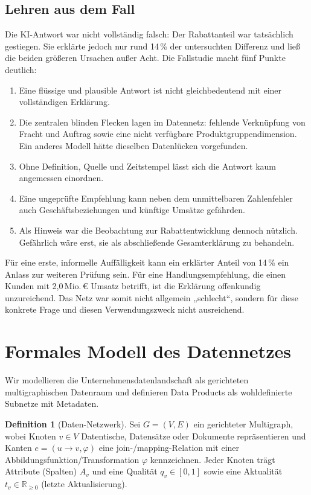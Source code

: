 \documentclass[a4paper,12pt]{article}
\theoremstyle{definition}
\newtheorem{definition}{Definition}[section]
\newcommand{\RR}{\mathbb{R}}
\begin{document}
\subsection{Lehren aus dem Fall}
Die KI-Antwort war nicht vollständig falsch: Der Rabattanteil war tatsächlich gestiegen. Sie erklärte jedoch nur rund 14\,\% der untersuchten Differenz und ließ die beiden größeren Ursachen außer Acht. Die Fallstudie macht fünf Punkte deutlich:
\begin{enumerate}
\item Eine flüssige und plausible Antwort ist nicht gleichbedeutend mit einer vollständigen Erklärung.
\item Die zentralen blinden Flecken lagen im Datennetz: fehlende Verknüpfung von Fracht und Auftrag sowie eine nicht verfügbare Produktgruppendimension. Ein anderes Modell hätte dieselben Datenlücken vorgefunden.
\item Ohne Definition, Quelle und Zeitstempel lässt sich die Antwort kaum angemessen einordnen.
\item Eine ungeprüfte Empfehlung kann neben dem unmittelbaren Zahlenfehler auch Geschäftsbeziehungen und künftige Umsätze gefährden.
\item Als Hinweis war die Beobachtung zur Rabattentwicklung dennoch nützlich. Gefährlich wäre erst, sie als abschließende Gesamterklärung zu behandeln.
\end{enumerate}
Für eine erste, informelle Auffälligkeit kann ein erklärter Anteil von 14\,\% ein Anlass zur weiteren Prüfung sein. Für eine Handlungsempfehlung, die einen Kunden mit 2{,}0\,Mio.\,€ Umsatz betrifft, ist die Erklärung offenkundig unzureichend. Das Netz war somit nicht allgemein „schlecht“, sondern für diese konkrete Frage und diesen Verwendungszweck nicht ausreichend.

\section{Formales Modell des Datennetzes}\label{sec:formal}
Wir modellieren die Unternehmensdatenlandschaft als gerichteten multigraphischen Datenraum und definieren Data Products als wohldefinierte Subnetze mit Metadaten.

\begin{definition}[Daten-Netzwerk]
Sei $G=(V,E)$ ein gerichteter Multigraph, wobei Knoten $v\in V$ Datentische, Datensätze oder Dokumente repräsentieren und Kanten $e=(u\to v,\varphi)$ eine join-/mapping-Relation mit einer Abbildungsfunktion/Transformation $\varphi$ kennzeichnen. Jeder Knoten trägt Attribute (Spalten) $A_v$ und eine Qualität $q_v\in[0,1]$ sowie eine Aktualität $t_v\in\RR_{\ge0}$ (letzte Aktualisierung).
\end{definition}
\end{document}
